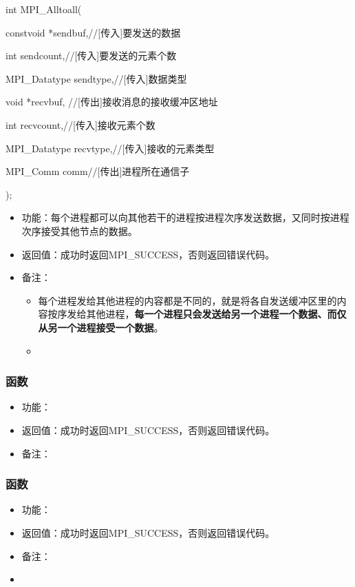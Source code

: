 \documentclass[UTF8]{article}%
\begin{document}
int MPI\_Alltoall(
    
    \qquad constvoid *sendbuf,//[传入]要发送的数据
    
    \qquad int sendcount,//[传入]要发送的元素个数
    
    \qquad MPI\_Datatype sendtype,//[传入]数据类型

    \qquad void *recvbuf, //[传出]接收消息的接收缓冲区地址

    \qquad int recvcount,//[传入]接收元素个数

    \qquad MPI\_Datatype recvtype,//[传入]接收的元素类型

    \qquad MPI\_Comm comm//[传出]进程所在通信子
    
);

\begin{itemize}
    \item 功能：每个进程都可以向其他若干的进程按进程次序发送数据，又同时按进程次序接受其他节点的数据。
    \item 返回值：成功时返回MPI\_SUCCESS，否则返回错误代码。
    \item 备注：
    
    {
        \begin{itemize}
            \item 每个进程发给其他进程的内容都是不同的，就是将各自发送缓冲区里的内容按序发给其他进程，\textbf{每一个进程只会发送给另一个进程一个数据、而仅从另一个进程接受一个数据}。
            \item 
        \end{itemize}
    }
    
\end{itemize}

\subsubsection{函数}

\begin{itemize}
    \item 功能：
    \item 返回值：成功时返回MPI\_SUCCESS，否则返回错误代码。
    \item 备注：
\end{itemize}

\subsubsection{函数}

\begin{itemize}
    \item 功能：
    \item 返回值：成功时返回MPI\_SUCCESS，否则返回错误代码。
    \item 备注：
\end{itemize}













\begin{itemize}
    \item 
\end{itemize}
\end{document}
